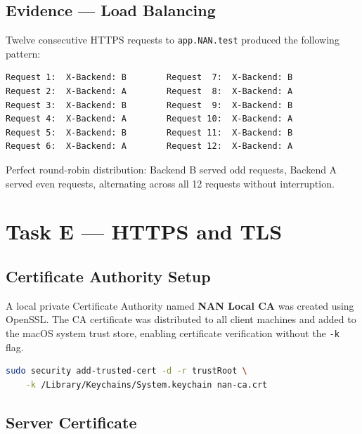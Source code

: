 \documentclass[12pt,a4paper]{article}
\begin{document}
\subsection{Evidence --- Load Balancing}

Twelve consecutive HTTPS requests to \texttt{app.NAN.test} produced the following pattern:

\begin{lstlisting}
Request 1:  X-Backend: B        Request  7:  X-Backend: B
Request 2:  X-Backend: A        Request  8:  X-Backend: A
Request 3:  X-Backend: B        Request  9:  X-Backend: B
Request 4:  X-Backend: A        Request 10:  X-Backend: A
Request 5:  X-Backend: B        Request 11:  X-Backend: B
Request 6:  X-Backend: A        Request 12:  X-Backend: A
\end{lstlisting}

\begin{successbox}[Result]
Perfect round-robin distribution: Backend B served odd requests, Backend A served even requests, alternating across all 12 requests without interruption.
\end{successbox}

\section{Task E --- HTTPS and TLS}

\subsection{Certificate Authority Setup}

A local private Certificate Authority named \textbf{NAN Local CA} was created using OpenSSL. The CA certificate was distributed to all client machines and added to the macOS system trust store, enabling certificate verification without the \texttt{-k} flag.

\begin{lstlisting}[language=bash, caption=Adding NAN Local CA to macOS trust store]
sudo security add-trusted-cert -d -r trustRoot \
    -k /Library/Keychains/System.keychain nan-ca.crt
\end{lstlisting}

\subsection{Server Certificate}
\end{document}
